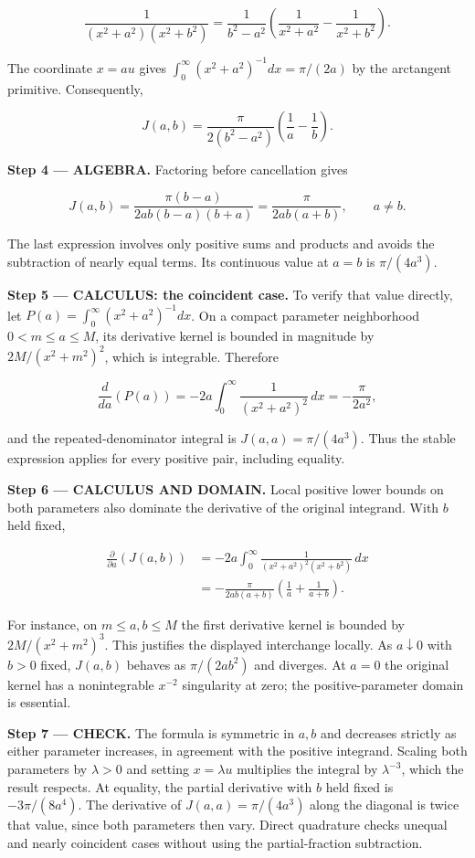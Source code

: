 \documentclass[11pt,oneside,openany]{book}
\begin{document}
\[
\frac{1}{(x^2+a^2)(x^2+b^2)}
=\frac{1}{b^2-a^2}\left(\frac{1}{x^2+a^2}-\frac{1}{x^2+b^2}\right).
\]

The coordinate \(x=a u\) gives \(\int_0^\infty(x^2+a^2)^{-1}dx=\pi/(2a)\) by the arctangent primitive. Consequently,

\[
J(a,b)=\frac{\pi}{2(b^2-a^2)}\left(\frac1a-\frac1b\right).
\]

\begingroup\color{AlgebraBlue}
\textbf{Step 4 --- ALGEBRA.} Factoring before cancellation gives

\[
J(a,b)=\frac{\pi(b-a)}{2ab(b-a)(b+a)}
=\frac{\pi}{2ab(a+b)},\qquad a\ne b.
\]

The last expression involves only positive sums and products and avoids the subtraction of nearly equal terms. Its continuous value at \(a=b\) is \(\pi/(4a^3)\).

\endgroup
\textbf{Step 5 --- CALCULUS: the coincident case.} To verify that value directly, let \(P(a)=\int_0^\infty(x^2+a^2)^{-1}dx\). On a compact parameter neighborhood \(0<m\le a\le M\), its derivative kernel is bounded in magnitude by \(2M/(x^2+m^2)^2\), which is integrable. Therefore

\[
\frac{d}{da}(P(a))=-2a\int_0^\infty\frac{1}{(x^2+a^2)^2}\,dx
=-\frac{\pi}{2a^2},
\]

and the repeated-denominator integral is \(J(a,a)=\pi/(4a^3)\). Thus the stable expression applies for every positive pair, including equality.

\begin{DomainStep}
\textbf{Step 6 --- CALCULUS AND DOMAIN.} Local positive lower bounds on both parameters also dominate the derivative of the original integrand. With \(b\) held fixed,

\[
\begin{aligned}
\frac{\partial}{\partial a}(J(a,b))
&=-2a\int_0^\infty\frac{1}{(x^2+a^2)^2(x^2+b^2)}\,dx\\
&=-\frac{\pi}{2ab(a+b)}\left(\frac1a+\frac{1}{a+b}\right).
\end{aligned}
\]

For instance, on \(m\le a,b\le M\) the first derivative kernel is bounded by \(2M/(x^2+m^2)^3\). This justifies the displayed interchange locally. As \(a\downarrow0\) with \(b>0\) fixed, \(J(a,b)\) behaves as \(\pi/(2ab^2)\) and diverges. At \(a=0\) the original kernel has a nonintegrable \(x^{-2}\) singularity at zero; the positive-parameter domain is essential.

\end{DomainStep}
\textbf{Step 7 --- CHECK.} The formula is symmetric in \(a,b\) and decreases strictly as either parameter increases, in agreement with the positive integrand. Scaling both parameters by \(\lambda>0\) and setting \(x=\lambda u\) multiplies the integral by \(\lambda^{-3}\), which the result respects. At equality, the partial derivative with \(b\) held fixed is \(-3\pi/(8a^4)\). The derivative of \(J(a,a)=\pi/(4a^3)\) along the diagonal is twice that value, since both parameters then vary. Direct quadrature checks unequal and nearly coincident cases without using the partial-fraction subtraction.
\end{document}
